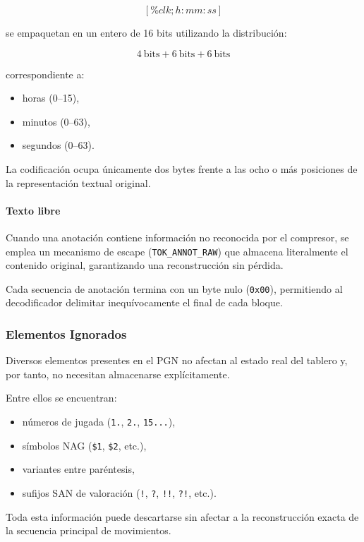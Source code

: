 \documentclass[11pt, letterpaper]{article}
\begin{document}
\[
[\%clk ; h:mm:ss]
\]

se empaquetan en un entero de 16 bits utilizando la distribución:

\[
4\ \text{bits} + 6\ \text{bits} + 6\ \text{bits}
\]

correspondiente a:

\begin{itemize}
\item horas (0--15),
\item minutos (0--63),
\item segundos (0--63).
\end{itemize}

La codificación ocupa únicamente dos bytes frente a las ocho o más posiciones de la representación textual original.

\paragraph{Texto libre}

Cuando una anotación contiene información no reconocida por el compresor, se emplea un mecanismo de escape (\texttt{TOK\_ANNOT\_RAW}) que almacena literalmente el contenido original, garantizando una reconstrucción sin pérdida.

Cada secuencia de anotación termina con un byte nulo (\texttt{0x00}), permitiendo al decodificador delimitar inequívocamente el final de cada bloque.

\subsubsection{Elementos Ignorados}

Diversos elementos presentes en el PGN no afectan al estado real del tablero y, por tanto, no necesitan almacenarse explícitamente.

Entre ellos se encuentran:

\begin{itemize}
\item números de jugada (\texttt{1.}, \texttt{2.}, \texttt{15...}),
\item símbolos NAG (\texttt{\$1}, \texttt{\$2}, etc.),
\item variantes entre paréntesis,
\item sufijos SAN de valoración (\texttt{!}, \texttt{?}, \texttt{!!}, \texttt{?!}, etc.).
\end{itemize}

Toda esta información puede descartarse sin afectar a la reconstrucción exacta de la secuencia principal de movimientos.
\end{document}
